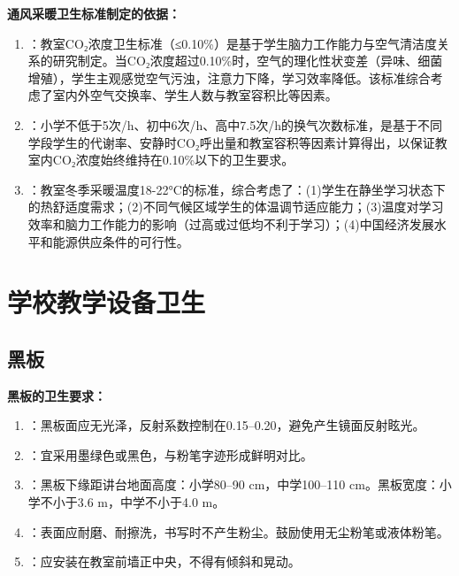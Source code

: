 \begin{tipbox}
\textbf{通风采暖卫生标准制定的依据：}

\begin{enumerate}[leftmargin=*]
    \item {}：教室CO₂浓度卫生标准（≤0.10\%）是基于学生脑力工作能力与空气清洁度关系的研究制定。当CO₂浓度超过0.10\%时，空气的理化性状变差（异味、细菌增殖），学生主观感觉空气污浊，注意力下降，学习效率降低。该标准综合考虑了室内外空气交换率、学生人数与教室容积比等因素。

    \item {}：小学不低于5次/h、初中6次/h、高中7.5次/h的换气次数标准，是基于不同学段学生的代谢率、安静时CO₂呼出量和教室容积等因素计算得出，以保证教室内CO₂浓度始终维持在0.10\%以下的卫生要求。

    \item {}：教室冬季采暖温度18-22°C的标准，综合考虑了：(1)学生在静坐学习状态下的热舒适度需求；(2)不同气候区域学生的体温调节适应能力；(3)温度对学习效率和脑力工作能力的影响（过高或过低均不利于学习）；(4)中国经济发展水平和能源供应条件的可行性。
\end{enumerate}
\end{tipbox}

\section{学校教学设备卫生}

\subsection{黑板}

\begin{keybox}
\textbf{黑板的卫生要求：}

\begin{enumerate}[leftmargin=*]
    \item {}：黑板面应无光泽，反射系数控制在0.15--0.20，避免产生镜面反射眩光。
    \item {}：宜采用墨绿色或黑色，与粉笔字迹形成鲜明对比。
    \item {}：黑板下缘距讲台地面高度：小学80--90 cm，中学100--110 cm。黑板宽度：小学不小于3.6 m，中学不小于4.0 m。
    \item {}：表面应耐磨、耐擦洗，书写时不产生粉尘。鼓励使用无尘粉笔或液体粉笔。
    \item {}：应安装在教室前墙正中央，不得有倾斜和晃动。
\end{enumerate}
\end{keybox}

